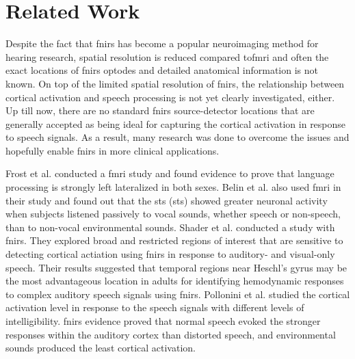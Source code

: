 \section{Related Work}


Despite the fact that \acrshort{fnirs} has become a popular neuroimaging method for hearing research, spatial resolution is reduced compared to\acrshort{fmri} and often the exact locations of \acrshort{fnirs} optodes and detailed anatomical information is not known. On top of the limited spatial resolution of \acrshort{fnirs}, the relationship between cortical activation and speech processing is not yet clearly investigated, either. Up till now,  there are no standard \acrshort{fnirs} source-detector locations that are generally accepted as being ideal for capturing the cortical activation in response to speech signals. As a result, many research was done to overcome the issues and hopefully enable \acrshort{fnirs} in more clinical applications.

Frost et al. \citeyearpar {Frost1999-vs} conducted a \acrshort{fmri} study and found evidence to prove that language processing is strongly left lateralized in both sexes. Belin et al. \citeyearpar {Belin2000} also used \acrshort{fmri} in their study and found out that the \acrlong{sts} (\acrshort{sts}) showed greater neuronal activity when subjects listened passively to vocal sounds, whether speech or non-speech, than to non-vocal environmental sounds. Shader et al. \citeyearpar {Shader2021} conducted a study with  \acrshort{fnirs}. They explored broad and restricted regions of interest that are sensitive to detecting cortical actiation using  \acrshort{fnirs} in response to auditory- and visual-only speech. Their results suggested that temporal regions near Heschl's gyrus may be the most advantageous location in adults for identifying hemodynamic responses to complex auditory speech signals using \acrshort{fnirs}. Pollonini et al. \citeyearpar{Pollonini2013} studied the cortical activation level in response to the speech signals with different levels of intelligibility.  \acrshort{fnirs} evidence proved that normal speech evoked the stronger responses within the auditory cortex than distorted speech, and environmental sounds produced the least cortical activation.



